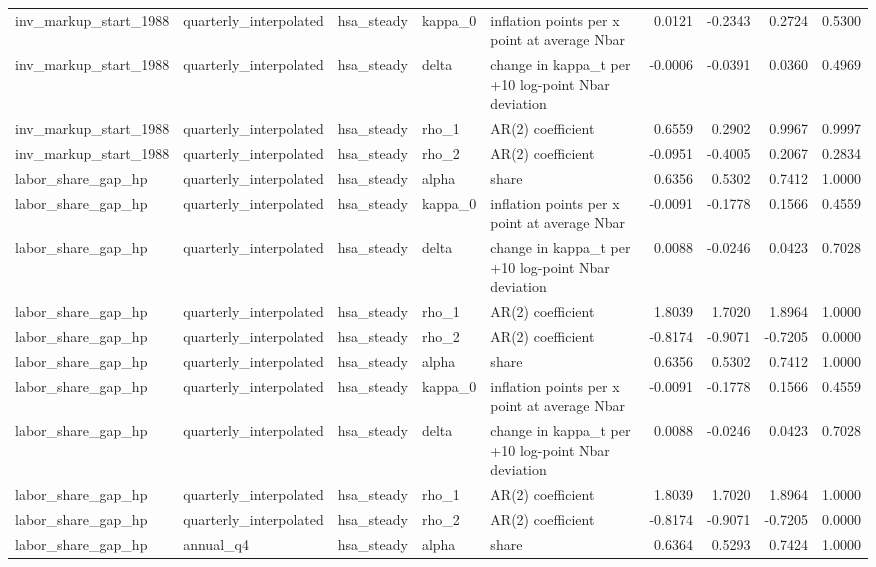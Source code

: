 \begin{tabular}{lllllrrrr}
inv\_markup\_start\_1988 & quarterly\_interpolated & hsa\_steady & kappa\_0 & inflation points per x point at average Nbar & 0.0121 & -0.2343 & 0.2724 & 0.5300 \\
inv\_markup\_start\_1988 & quarterly\_interpolated & hsa\_steady & delta & change in kappa\_t per +10 log-point Nbar deviation & -0.0006 & -0.0391 & 0.0360 & 0.4969 \\
inv\_markup\_start\_1988 & quarterly\_interpolated & hsa\_steady & rho\_1 & AR(2) coefficient & 0.6559 & 0.2902 & 0.9967 & 0.9997 \\
inv\_markup\_start\_1988 & quarterly\_interpolated & hsa\_steady & rho\_2 & AR(2) coefficient & -0.0951 & -0.4005 & 0.2067 & 0.2834 \\
labor\_share\_gap\_hp & quarterly\_interpolated & hsa\_steady & alpha & share & 0.6356 & 0.5302 & 0.7412 & 1.0000 \\
labor\_share\_gap\_hp & quarterly\_interpolated & hsa\_steady & kappa\_0 & inflation points per x point at average Nbar & -0.0091 & -0.1778 & 0.1566 & 0.4559 \\
labor\_share\_gap\_hp & quarterly\_interpolated & hsa\_steady & delta & change in kappa\_t per +10 log-point Nbar deviation & 0.0088 & -0.0246 & 0.0423 & 0.7028 \\
labor\_share\_gap\_hp & quarterly\_interpolated & hsa\_steady & rho\_1 & AR(2) coefficient & 1.8039 & 1.7020 & 1.8964 & 1.0000 \\
labor\_share\_gap\_hp & quarterly\_interpolated & hsa\_steady & rho\_2 & AR(2) coefficient & -0.8174 & -0.9071 & -0.7205 & 0.0000 \\
labor\_share\_gap\_hp & quarterly\_interpolated & hsa\_steady & alpha & share & 0.6356 & 0.5302 & 0.7412 & 1.0000 \\
labor\_share\_gap\_hp & quarterly\_interpolated & hsa\_steady & kappa\_0 & inflation points per x point at average Nbar & -0.0091 & -0.1778 & 0.1566 & 0.4559 \\
labor\_share\_gap\_hp & quarterly\_interpolated & hsa\_steady & delta & change in kappa\_t per +10 log-point Nbar deviation & 0.0088 & -0.0246 & 0.0423 & 0.7028 \\
labor\_share\_gap\_hp & quarterly\_interpolated & hsa\_steady & rho\_1 & AR(2) coefficient & 1.8039 & 1.7020 & 1.8964 & 1.0000 \\
labor\_share\_gap\_hp & quarterly\_interpolated & hsa\_steady & rho\_2 & AR(2) coefficient & -0.8174 & -0.9071 & -0.7205 & 0.0000 \\
labor\_share\_gap\_hp & annual\_q4 & hsa\_steady & alpha & share & 0.6364 & 0.5293 & 0.7424 & 1.0000 \\

\end{tabular}

